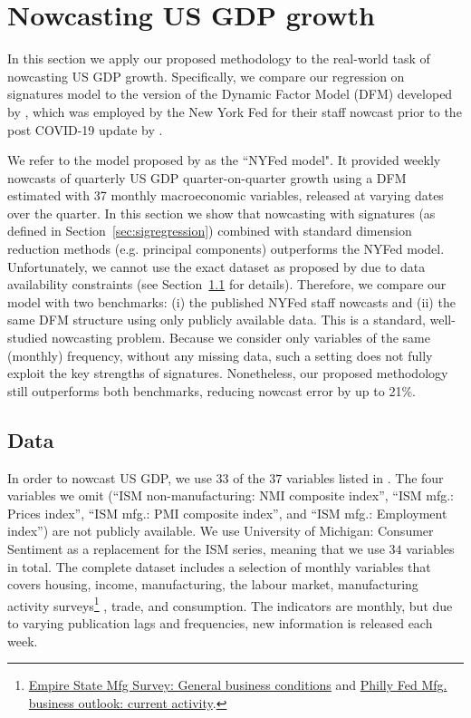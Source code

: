 \documentclass[a4paper, 12pt]{article}
\theoremstyle{remark}
\begin{document}
\section{Nowcasting US GDP growth}\label{sec:NYfedapplication}
In this section we apply our proposed methodology to the real-world task of nowcasting US GDP growth. Specifically, we compare our regression on signatures model to the version of the Dynamic Factor Model (DFM) developed by \citet{bok2018macroeconomic}, which was employed by the New York Fed for their staff nowcast prior to the post COVID-19 update by \citet{almuzara2023new}. 

We refer to the model proposed by \cite{bok2018macroeconomic} as the ``NYFed model". It provided weekly nowcasts of quarterly US GDP quarter-on-quarter growth using a DFM estimated with 37 monthly macroeconomic variables, released at varying dates over the quarter. In this section we show that nowcasting with signatures (as defined in Section~\ref{sec:sigregression}) combined with standard dimension reduction methods (e.g. principal components) outperforms the NYFed model. Unfortunately, we cannot use the exact dataset as proposed by \citet{bok2018macroeconomic} due to data availability constraints (see Section~\ref{US_now_data} for details). Therefore, we compare our model with two benchmarks: (i) the published NYFed staff nowcasts and (ii) the same DFM structure using only publicly available data. This is a standard, well-studied nowcasting problem. Because we consider only variables of the same (monthly) frequency, without any missing data, such a setting does not fully exploit the key strengths of signatures. Nonetheless, our proposed methodology still outperforms both benchmarks, reducing nowcast error by up to 21\%.

\subsection{Data}\label{US_now_data}

In order to nowcast US GDP, we use $33$ of the $37$ variables listed in \citet{bok2018macroeconomic}. The four variables we omit (``ISM non-manufacturing: NMI composite index'', ``ISM mfg.: Prices index'', ``ISM mfg.: PMI composite index'', and ``ISM mfg.: Employment index'') are not publicly available. We use University of Michigan: Consumer Sentiment \citep{curtin2008consumer} as a replacement for the ISM series, meaning that we use $34$ variables in total. The complete dataset includes a selection of monthly variables that covers housing, income, manufacturing, the labour market, manufacturing activity surveys\footnote{\href{https://fred.stlouisfed.org/series/GACDISA066MSFRBNY}{Empire State Mfg Survey: General business conditions} and \href{https://fred.stlouisfed.org/series/GACDFSA066MSFRBPHI}{Philly Fed Mfg. business outlook: current activity}.}
, trade, and consumption. The indicators are monthly, but due to varying publication lags and frequencies, new information is released each week.
\end{document}
